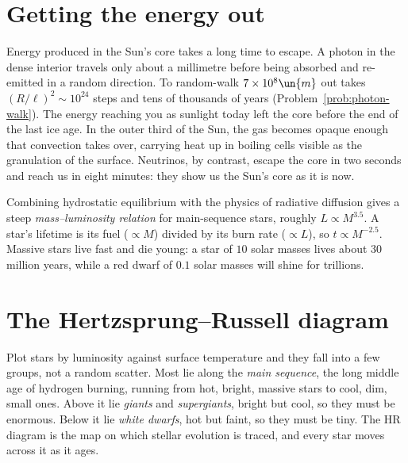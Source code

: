 \section{Getting the energy out}

Energy produced in the Sun's core takes a long time to escape. A photon in the dense interior travels only about a millimetre before being absorbed and re-emitted in a random direction. To random-walk $7\times10^{8}\un{m}$ out takes $(R/\ell)^2\sim10^{24}$ steps and tens of thousands of years (Problem~\ref{prob:photon-walk}). The energy reaching you as sunlight today left the core before the end of the last ice age. In the outer third of the Sun, the gas becomes opaque enough that convection takes over, carrying heat up in boiling cells visible as the granulation of the surface. Neutrinos, by contrast, escape the core in two seconds and reach us in eight minutes: they show us the Sun's core as it is now.

Combining hydrostatic equilibrium with the physics of radiative diffusion gives a steep \emph{mass--luminosity relation} for main-sequence stars, roughly $L\propto M^{3.5}$. A star's lifetime is its fuel ($\propto M$) divided by its burn rate ($\propto L$), so $t\propto M^{-2.5}$. Massive stars live fast and die young: a star of $10$ solar masses lives about $30$ million years, while a red dwarf of $0.1$ solar masses will shine for trillions.

\section{The Hertzsprung--Russell diagram}

Plot stars by luminosity against surface temperature and they fall into a few groups, not a random scatter. Most lie along the \emph{main sequence}, the long middle age of hydrogen burning, running from hot, bright, massive stars to cool, dim, small ones. Above it lie \emph{giants} and \emph{supergiants}, bright but cool, so they must be enormous. Below it lie \emph{white dwarfs}, hot but faint, so they must be tiny. The HR diagram is the map on which stellar evolution is traced, and every star moves across it as it ages.


